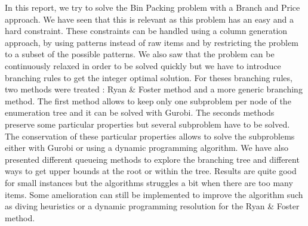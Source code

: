 In this report, we try to solve the Bin Packing problem with a Branch and Price approach. We have seen that this is relevant as this problem has an easy and a hard constraint. These constraints can be handled using a column generation approach, by using patterns instead of raw items and by restricting the problem to a subset of the possible patterns. We also saw that the problem can be continuously relaxed in order to be solved quickly but we have to introduce branching rules to get the integer optimal solution. For theses branching rules, two methods were treated : Ryan \& Foster method and a more generic branching method. The first method allows to keep only one subproblem per node of the enumeration tree and it can be solved with Gurobi. The seconds methods preserve some particular properties but several subproblem have to be solved. The conservation of these particular properties allows to solve the subproblems either with Gurobi or using a dynamic programming algorithm. We have also presented different queueing methods to explore the branching tree and different ways to get upper bounds at the root or within the tree. Results are quite good for small instances but the algorithms struggles a bit when there are too many items. Some amelioration can still be implemented to improve the algorithm such as diving heuristics or a dynamic programming resolution for the Ryan \& Foster method.